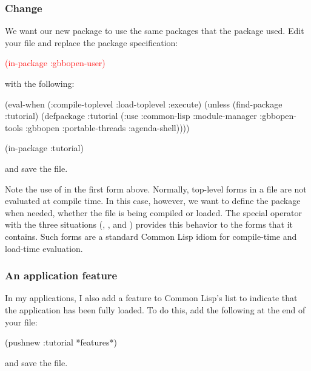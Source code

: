 \documentclass[10pt,twoside,english,pdftex]{article}
\begin{document}
\subsubsection*{Change }
%
We want our new  package to use the same packages that the
 package used. Edit your
 file and replace the
 package specification:
%
\W\supp
\begin{example}
  \textcolor{red}{(in-package :gbbopen-user)}
\end{example}
%
with the following:
%
\W\supp\notpretop
\begin{example}
  (eval-when (:compile-toplevel :load-toplevel :execute)
    (unless (find-package :tutorial)
      (defpackage :tutorial
        (:use :common-lisp :module-manager :gbbopen-tools :gbbopen 
              :portable-threads :agenda-shell))))

  (in-package :tutorial)
\end{example}
%
and save the file.

Note the use of  in the first form above.  Normally,
top-level forms in a file are not evaluated at compile time.  In this case,
however, we want to define the  package when needed, whether
the file is being compiled or loaded.  The  special
operator with the three situations (,
, and ) provides this behavior to
the forms that it contains.  Such  forms are a standard
Common Lisp idiom for compile-time and load-time evaluation.

\subsubsection*{An application feature}
%
In my applications, I also add a feature to Common Lisp's 
list to indicate that the application has been fully loaded.  To do this, add
the following at the end of your  file:
%
\W\supp
\begin{example}
  (pushnew :tutorial *features*)
\end{example}
%
and save the file.
\end{document}
